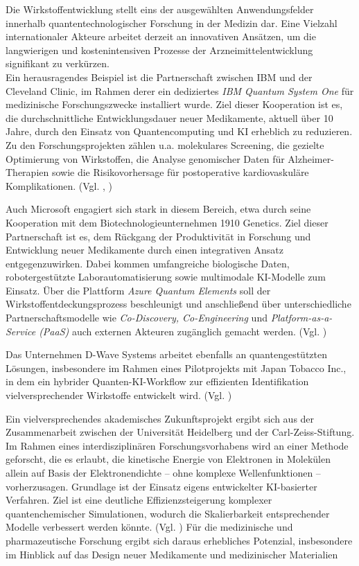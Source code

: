 Die Wirkstoffentwicklung stellt eins der ausgewählten Anwendungsfelder innerhalb quantentechnologischer Forschung in der Medizin dar. Eine Vielzahl internationaler Akteure arbeitet derzeit an innovativen Ansätzen, um die langwierigen und kostenintensiven Prozesse der Arzneimittelentwicklung signifikant zu verkürzen.\\

Ein herausragendes Beispiel ist die Partnerschaft zwischen IBM und der Cleveland Clinic, im Rahmen derer ein dediziertes \textit{IBM Quantum System One} für medizinische Forschungszwecke installiert wurde. Ziel dieser Kooperation ist es, die durchschnittliche Entwicklungsdauer neuer Medikamente, aktuell über 10 Jahre, durch den Einsatz von Quantencomputing und KI erheblich zu reduzieren. Zu den Forschungsprojekten zählen u.a. molekulares Screening, die gezielte Optimierung von Wirkstoffen, die Analyse genomischer Daten für Alzheimer-Therapien sowie die Risikovorhersage für postoperative kardiovaskuläre Komplikationen. (Vgl. \cite{noauthor_cleveland_2023}, \cite{flotherHowQuantumComputing2025})

Auch Microsoft engagiert sich stark in diesem Bereich, etwa durch seine Kooperation mit dem Biotechnologieunternehmen 1910 Genetics. Ziel dieser Partnerschaft ist es, dem Rückgang der Produktivität in Forschung und Entwicklung neuer Medikamente durch einen integrativen Ansatz entgegenzuwirken. Dabei kommen umfangreiche biologische Daten, robotergestützte Laborautomatisierung sowie multimodale KI-Modelle zum Einsatz. Über die Plattform \textit{Azure Quantum Elements} soll der Wirkstoffentdeckungsprozess beschleunigt und anschließend über unterschiedliche Partnerschaftsmodelle wie \textit{Co-Discovery, Co-Engineering }und\textit{ Platform-as-a-Service (PaaS)} auch externen Akteuren zugänglich gemacht werden. (Vgl. \cite{alamMicrosoft1910Genetics2024})

Das Unternehmen D-Wave Systems arbeitet ebenfalls an quantengestützten Lösungen, insbesondere im Rahmen eines Pilotprojekts mit Japan Tobacco Inc., in dem ein hybrider Quanten-KI-Workflow zur effizienten Identifikation vielversprechender Wirkstoffe entwickelt wird. (Vgl. \cite{JapanTobaccoInc2024})

Ein vielversprechendes akademisches Zukunftsprojekt ergibt sich aus der Zusammenarbeit zwischen der Universität Heidelberg und der Carl-Zeiss-Stiftung. Im Rahmen eines interdisziplinären Forschungsvorhabens wird an einer Methode geforscht, die es erlaubt, die kinetische Energie von Elektronen in Molekülen allein auf Basis der Elektronendichte – ohne komplexe Wellenfunktionen – vorherzusagen. Grundlage ist der Einsatz eigens entwickelter KI-basierter Verfahren. Ziel ist eine deutliche Effizienzsteigerung komplexer quantenchemischer Simulationen, wodurch die Skalierbarkeit entsprechender Modelle verbessert werden könnte.  (Vgl. \cite{noauthor_mithilfe_2025}) Für die medizinische und pharmazeutische Forschung ergibt sich daraus erhebliches Potenzial, insbesondere im Hinblick auf das Design neuer Medikamente und medizinischer Materialien

